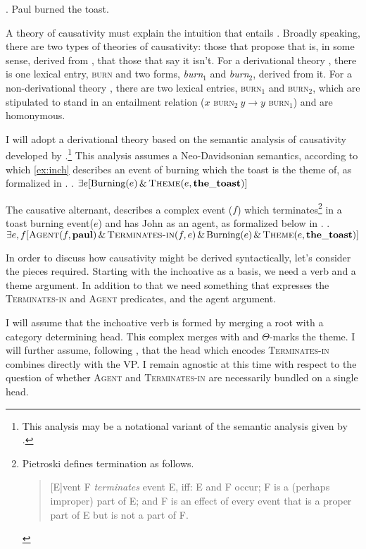 \documentclass[letterpaper,12pt]{article}
\begin{document}
\ex.\label{ex:caus} Paul burned the toast.

A theory of causativity must explain the intuition that \Last entails \LLast.
Broadly speaking, there are two types of theories of causativity: those that propose that \Last is, in some sense, derived from \LLast, that those that say it isn't.
For a derivational theory \parencite[e.g.][]{lakoff1976toward,hale1993argument,pietroski2003small}, there is one lexical entry, \textsc{burn} and two forms, \textit{burn}$_1$ and \textit{burn}$_2$, derived from it.
For a non-derivational theory \parencite[e.g.][]{fodor1970three}, there are two lexical entries, \textsc{burn}$_1$ and \textsc{burn$_2$}, which are stipulated to stand in an entailment relation ($x$ \textsc{burn}$_2\: y \rightarrow y$ \textsc{burn}$_1$) and are homonymous.

I will adopt a derivational theory based on the semantic analysis of causativity developed by \textcite{pietroski2003small}.\footnote{
  This analysis may be a notational variant of the semantic analysis given by \textcite{kratzer_building_2004}.
}
This analysis assumes a Neo-Davidsonian semantics, according to which \ref{ex:inch} describes an event of burning which the toast is the theme of, as formalized in \Next.
\ex. $\exists e [\text{Burning}(e)\, \&\, \textsc{Theme}(e, \mathbf{the\_toast})]$

The causative alternant, describes a complex event ($f$) which terminates\footnote{
  Pietroski defines termination as follows.
\begin{quote}
  [E]vent F \textit{terminates} event E, iff: E and F occur; F is a (perhaps improper) part of E; and F is an effect of every event that is a proper part of E but is not a part of F.\hfill\parencite[p190]{pietroski2003small}
\end{quote}
} in a toast burning event($e$) and has John as an agent, as formalized below in \Next.
\ex. $\exists e,f [ \textsc{Agent}(f, \mathbf{paul}) \,\&\, \textsc{Terminates-in}(f, e) \,\&\,\text{Burning}(e)\, \&\, \textsc{Theme}(e, \mathbf{the\_toast})]$

In order to discuss how causativity might be derived syntactically, let's consider the pieces required.
Starting with the inchoative as a basis, we need a verb and a theme argument.
In addition to that we need something that expresses the \textsc{Terminates-in} and \textsc{Agent} predicates, and the agent argument.

I will assume that the inchoative verb is formed by merging a root with a category determining head.
This complex merges with and $\Theta$-marks the theme.
I will further assume, following \textcite{pietroski2003small}, that the head which encodes \textsc{Terminates-in} combines directly with the VP.
I remain agnostic at this time with respect to the question of whether \textsc{Agent} and \textsc{Terminates-in} are necessarily bundled on a single head.
\end{document}
